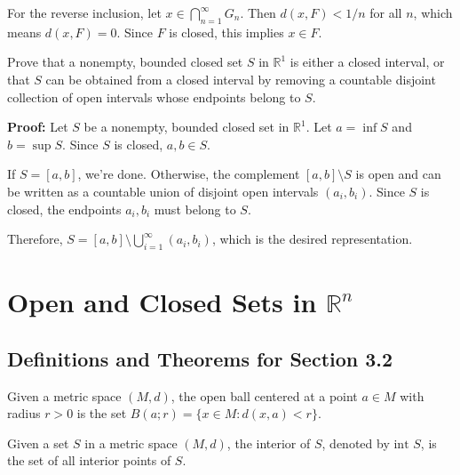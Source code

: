 For the reverse inclusion, let $x \in \bigcap_{n=1}^{\infty} G_n$. Then $d(x,F) < 1/n$ for all $n$, which means $d(x,F) = 0$. Since $F$ is closed, this implies $x \in F$.

\begin{problembox}
Prove that a nonempty, bounded closed set $S$ in $\mathbb{R}^1$ is either a closed interval, or that $S$ can be obtained from a closed interval by removing a countable disjoint collection of open intervals whose endpoints belong to $S$.
\end{problembox}

\textbf{Proof:} Let $S$ be a nonempty, bounded closed set in $\mathbb{R}^1$. Let $a = \inf S$ and $b = \sup S$. Since $S$ is closed, $a, b \in S$.

If $S = [a,b]$, we're done. Otherwise, the complement $[a,b] \setminus S$ is open and can be written as a countable union of disjoint open intervals $(a_i, b_i)$. Since $S$ is closed, the endpoints $a_i, b_i$ must belong to $S$.

Therefore, $S = [a,b] \setminus \bigcup_{i=1}^{\infty} (a_i, b_i)$, which is the desired representation.

\section{Open and Closed Sets in $\mathbb{R}^n$}

\subsection*{Definitions and Theorems for Section 3.2}

\begin{definition}
Given a metric space $(M,d)$, the open ball centered at a point $a \in M$ with radius $r > 0$ is the set $B(a;r) = \{x \in M : d(x,a) < r\}$.
\end{definition}

\begin{definition}
Given a set $S$ in a metric space $(M,d)$, the interior of $S$, denoted by $\text{int } S$, is the set of all interior points of $S$.
\end{definition}

